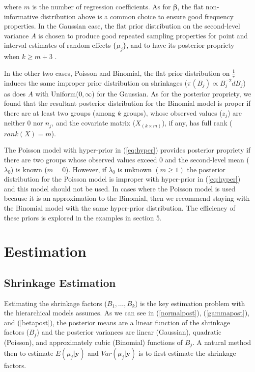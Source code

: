 \documentclass[article]{jss}
\begin{document}
where $m$ is the number of regression coefficients. As for $\boldsymbol{\beta}$, the flat non-informative distribution above is a common choice to ensure good frequency properties. In the Gaussian case, the flat prior distribution on the second-level variance $A$ is chosen to produce good repeated sampling properties for point and interval estimates of random effects $\{\mu_{j}\}$, and to have its posterior propriety when $k\ge m+3$ \citep{2011}. 



In the other two cases, Poisson and Binomial, the flat prior distribution on $\frac{1}{r}$ induces the same improper prior distribution on shrinkages ($\pi(B_{j})\propto B_{j}^{-2} d B_j$) as does $A$ with Uniform($0, \infty$) for the Gaussian. As for the posterior propriety, we found that the resultant posterior distribution for the Binomial model is proper if there are at least two groups (among $k$ groups), whose observed values ($z_{j}$) are neither 0 nor $n_j$,  and the covariate matrix ($X_{(k\times m )}$), if any,  has full rank ($rank(X)=m$). 


The Poisson model with hyper-prior in (\ref{eq:hyper}) provides posterior propriety if there are two groups whose observed values exceed 0 and the second-level mean ($\lambda_0$) is known ($m=0$). However, if $\lambda_0$ is unknown $(m \geq 1)$ the posterior distribution for the Poisson model is improper with hyper-prior in (\ref{eq:hyper}) and this model should not be used. In cases where the Poisson model is used because it is an approximation to the Binomial, then we recommend staying with the Binomial model with the same hyper-prior distribution. The efficiency of these priors is explored in the examples in section 5.



\section[Estimation]{Eestimation}\label{sec3}

\subsection[Shrinkage estimation]{Shrinkage Estimation}
Estimating the shrinkage factors ($B_1, \ldots, B_k$) is the key estimation problem with the hierarchical models  assumes. As we can see in (\ref{normalpost}), (\ref{gammapost}), and (\ref{betapost}), the posterior means are a linear function of the shrinkage factors ($B_{j}$) and the posterior variances are linear (Gaussian), quadratic (Poisson), and  approximately cubic (Binomial) functions of $B_{j}$. A natural method then to estimate $E(\mu_{j}\vert \boldsymbol{y})$ and $Var(\mu_{j}\vert \boldsymbol{y})$ is to first estimate the shrinkage factors.
\end{document}
